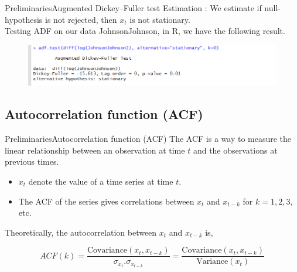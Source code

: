 \documentclass{beamer}
\begin{document}
\begin{frame}{Preliminaries}{Augmented Dickey–Fuller test}
Estimation : We estimate if null-hypothesis is not rejected, then $ x_t $ is not stationary. \\
	
	
Testing ADF on our data JohnsonJohnson, in R, we have the following result. 

\begin{figure}
\centering
\includegraphics[width=1\linewidth]{ADFtest}
\end{figure}
	
\end{frame}	

\subsection{Autocorrelation function (ACF)}
\begin{frame}{Preliminaries}{Autocorrelation function (ACF)}
The ACF is a way to measure the linear relationship between an observation at time $ t $ and the observations at previous times. 	
	
	\begin{itemize}
\item $ x_t $ denote the value of a time series at time $ t $. \\
\item The ACF of the series gives correlations between $ x_t $ and $ x_{t-k} $ for $ k = 1, 2, 3, $ etc.  
\end{itemize}

Theoretically, the autocorrelation between $ x_t $ and $ x_{t-k} $ is, 	

\begin{equation*} 
ACF(k) = \frac{\text{Covariance}(x_t,  x_{t-k})}{\sigma_{{x_t}}. \sigma_{x_{t-k}}}  = \frac{\text{Covariance}(x_t, x_{t-k})}{\text{Variance}(x_t)}
\end{equation*}

\end{frame}
\end{document}
